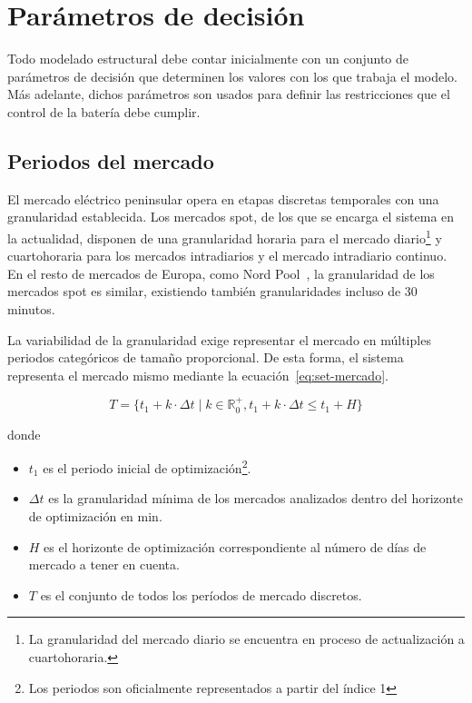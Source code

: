 \section{Parámetros de decisión}%
\label{makereference5.1}

Todo modelado estructural debe contar inicialmente con un conjunto de parámetros de decisión que determinen los valores con los que trabaja el modelo. Más adelante, dichos parámetros son usados para definir las restricciones que el control de la batería debe cumplir.

\subsection{Periodos del mercado}%
\label{makereference5.1.1}

El mercado eléctrico peninsular opera en etapas discretas temporales con una granularidad establecida. Los mercados spot, de los que se encarga el sistema en la actualidad, disponen de una granularidad horaria para el mercado diario\footnote{La granularidad del mercado diario se encuentra en proceso de actualización a cuartohoraria.} y cuartohoraria para los mercados intradiarios y el mercado intradiario continuo. En el resto de mercados de Europa, como Nord Pool~\cite{nord2025leading}, la granularidad de los mercados spot es similar, existiendo también granularidades incluso de 30 minutos.

La variabilidad de la granularidad exige representar el mercado en múltiples periodos categóricos de tamaño proporcional. De esta forma, el sistema representa el mercado mismo mediante la ecuación~\ref{eq:set-mercado}.

\begin{samepage}

  \begin{equation}%
    \label{eq:set-mercado}
    T = \{t_{1} + k \cdot \Delta t \mid k \in \mathbb{R}^{+}_{0}, t_{1} + k \cdot \Delta t \leq t_{1} + H\}
  \end{equation}

  donde

  \begin{itemize}

    \item \( t_{1} \) es el periodo inicial de optimización\footnote{Los periodos son oficialmente representados a partir del índice 1}.

    \item \( \Delta t \) es la granularidad mínima de los mercados analizados dentro del horizonte de optimización en \si{\minute}.

    \item \( H \) es el horizonte de optimización correspondiente al número de días de mercado a tener en cuenta.

    \item \( T \) es el conjunto de todos los períodos de mercado discretos.

  \end{itemize}

\end{samepage}

